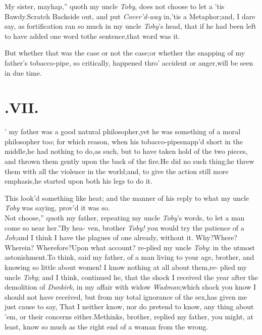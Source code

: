 \documentclass{article}
\begin{document}
\tsh \lqq My sister, mayhap,” quoth my uncle \textit{Toby},
\lqq does not choose to let a
’tis Bawdy.\tsk Scratch Backside out, and put
\textit{Cover’d-way} in,\tsk ’tis a Metaphor;\tsk\break and, I dare say, as
fortification ran so much in my uncle \textit{Toby}’s head, that if he had
been left to have added one word to\break the sentence,\tsh that word was
it.


But whether that was the case or not the case;\tsk or whether
the snapping of my father’s tobacco-pipe, so critically,
happened thro’ accident or anger,\tsk will be seen in due time.\\
\newpage
\null
\section{.\enspace  VII.}

’ my father was a good natural
philosopher,\tsk yet he was something of a moral philosopher
too; for which reason, when his tobacco-pipe\break snapp’d short
in the middle,\tsk he had nothing to do,\tsk as such,\tsk
but to have taken hold of the two pieces, and thrown them
gently upon the back of the fire.\tsh\break He did no such
thing;\tsh he threw them with all the violence in the
world;\tsk and, to give the action still more
emphasis,\tsk\break he started upon both his legs to\break
do it.

This look’d something like heat;\tsh\break
and the manner of his reply to what\break
my uncle \textit{Toby} was saying, prov’d it\break
was so.\\
\newpage
\tsh \lqq Not choose,” quoth my father,
repeating my uncle \textit{Toby}’s words, \lqq to let\break
\lqq a man come so near her.”\tsh By hea-\break
ven, brother \textit{Toby!} you would try the patience of a
\textit{Job};\tsk and I think I have the plagues of one
already, without it.\break
\tsh Why?\tsh Where?\tsh Wherein?\tsh\break
Wherefore?\tsh Upon what account? re-\break plied my uncle \textit{Toby}: in the utmost
asto\-nishment.\tsk To think, said my father, of a man living to
your age, brother, and knowing so little about
women!\tsh\break
I know nothing at all about them,\tsk re-\break
plied
my uncle \textit{Toby}; and I think, continued he, that the shock I
received the year after the demolition of \textit{Dunkirk}, in my
affair with widow \textit{Wadman};\tsk which shock you know I
should not have received, but from my total ignorance of the
sex,\tsk has given me just cause to say, That I neither
know, nor do pretend to
know, any thing about ’em, or their\break
concerns either.\tsh Methinks, brother,\break
replied my father, you might, at least,\break
know so much as the right end of a\break
woman from the wrong.
\end{document}
